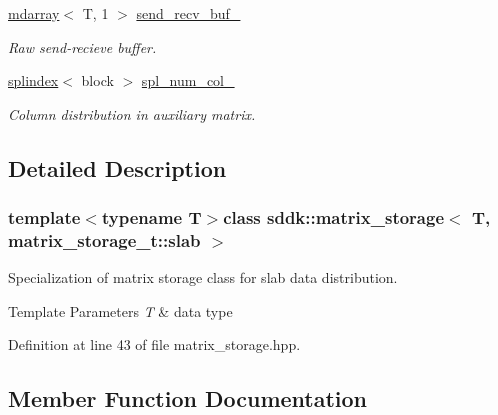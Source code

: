 \begin{DoxyCompactItemize}
\hyperlink{classsddk_1_1mdarray}{mdarray}$<$ T, 1 $>$ \hyperlink{classsddk_1_1matrix__storage_3_01_t_00_01matrix__storage__t_1_1slab_01_4_a9437d5b26bc924ac2d002eb490c5fad8}{send\+\_\+recv\+\_\+buf\+\_\+}
\begin{DoxyCompactList}\small\item\em Raw send-\/recieve buffer. \end{DoxyCompactList}\item 
\hyperlink{classsddk_1_1splindex}{splindex}$<$ block $>$ \hyperlink{classsddk_1_1matrix__storage_3_01_t_00_01matrix__storage__t_1_1slab_01_4_abcb07402371c615777ed73f1d0811e00}{spl\+\_\+num\+\_\+col\+\_\+}
\begin{DoxyCompactList}\small\item\em Column distribution in auxiliary matrix. \end{DoxyCompactList}\end{DoxyCompactItemize}


\subsection{Detailed Description}
\subsubsection*{template$<$typename T$>$class sddk\+::matrix\+\_\+storage$<$ T, matrix\+\_\+storage\+\_\+t\+::slab $>$}

Specialization of matrix storage class for slab data distribution. 


\begin{DoxyTemplParams}{Template Parameters}
{\em T} & data type \\
\hline
\end{DoxyTemplParams}


Definition at line 43 of file matrix\+\_\+storage.\+hpp.



\subsection{Member Function Documentation}
\hypertarget{classsddk_1_1matrix__storage_3_01_t_00_01matrix__storage__t_1_1slab_01_4_a51477b707dbf4ee6c8ebf3ff3bda2ad9}{}
